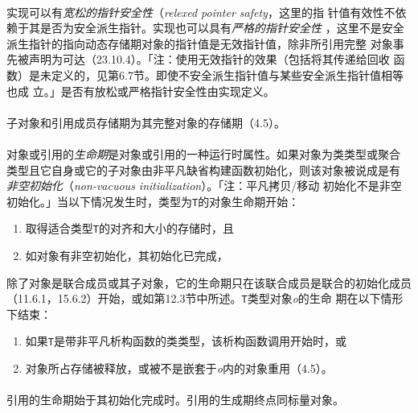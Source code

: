 \paragraph{}
实现可以有\textit{宽松的指针安全性}（\textit{relexed pointer safety}，这里的指
针值有效性不依赖于其是否为安全派生指针。实现也可以具有\textit{严格的指针安全性}
，这里不是安全派生指针的指向动态存储期对象的指针值是无效指针值，除非所引用完整
对象事先被声明为可达（23.10.4）。「注：使用无效指针的效果（包括将其传递给回收
函数）是未定义的，见第6.7节。即使不安全派生指针值与某些安全派生指针值相等也成
立。」是否有放松或严格指针安全性由实现定义。

\paragraph{}
子对象和引用成员存储期为其完整对象的存储期（4.5）。

\paragraph{}
对象或引用的\textit{生命期}是对象或引用的一种运行时属性。如果对象为类类型或聚合
类型且它自身或它的子对象由非平凡缺省构建函数初始化，则该对象被说成是有
\textit{非空初始化}（\textit{non-vacuous initialization}）。「注：平凡拷贝/移动
初始化不是非空初始化。」当以下情况发生时，类型为\texttt{T}的对象生命期开始：
\begin{enumerate}
  \item{取得适合类型\texttt{T}的对齐和大小的存储时，且}
  \item{如对象有非空初始化，其初始化已完成，}
\end{enumerate}
除了对象是联合成员或其子对象，它的生命期只在该联合成员是联合的初始化成员
（11.6.1，15.6.2）开始，或如第12.3节中所述。\texttt{T}类型对象\textit{o}的生命
期在以下情形下结束：
\begin{enumerate}
  \item{如果\texttt{T}是带非平凡析构函数的类类型，该析构函数调用开始时，或}
  \item{对象所占存储被释放，或被不是嵌套于\textit{o}内的对象重用（4.5）。}
\end{enumerate}

\paragraph{}
引用的生命期始于其初始化完成时。引用的生成期终点同标量对象。

